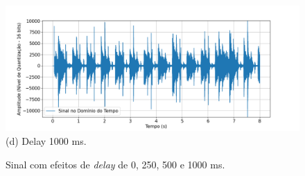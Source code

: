 \begin{figure}[htpb]
    \begin{minipage}[b]{0.7\textwidth}
        \centering
        \includegraphics[width=\textwidth]{figuras/fig77.png}
        \vspace{0.3cm} %
        (d) Delay 1000 ms.
    \end{minipage}

    \caption{Sinal com efeitos de \textit{delay} de 0, 250, 500 e 1000 ms.}
    \label{fig74}
\end{figure}







